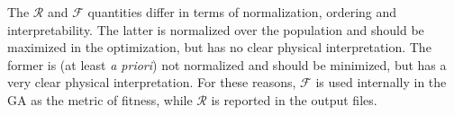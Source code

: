 \documentclass[10pt,a4paper,openany]{memoir}
\numberwithin{equation}{section}
\begin{document}
  The $\mathcal{R}$ and $\mathcal{F}$ quantities differ in terms of normalization, ordering and interpretability.
The latter is normalized over the population and should be maximized in the optimization, but has no clear physical interpretation.
The former is (at least \textit{a priori}) not normalized and should be minimized, but has a very clear physical interpretation.
For these reasons, $\mathcal{F}$ is used internally in the GA as the metric of fitness, while $\mathcal{R}$ is reported in the output files.


\end{document}
